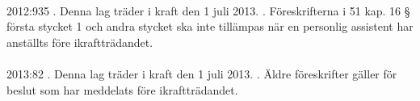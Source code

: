 \documentclass[a4paper,notitlepage,openany,10pt]{book}
\begin{document}
\paragraph*{}
2012:935
. Denna lag träder i kraft den 1 juli 2013.
. Föreskrifterna i 51 kap. 16 § första stycket 1 och andra stycket ska inte tillämpas när en personlig assistent har anställts före ikraftträdandet.
\paragraph*{}
2013:82
. Denna lag träder i kraft den 1 juli 2013.
. Äldre föreskrifter gäller för beslut som har meddelats före ikraftträdandet.
\end{document}
